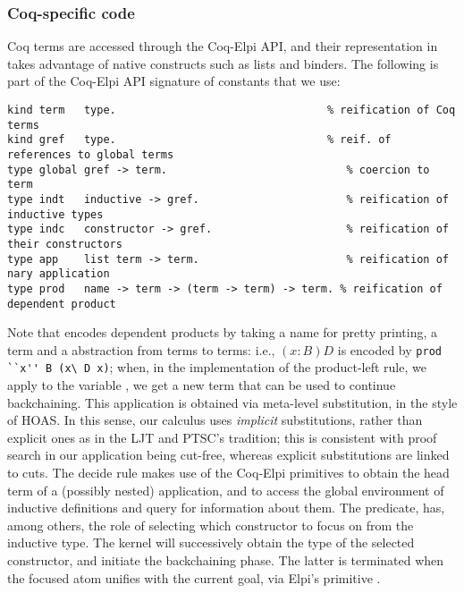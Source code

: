 \subsubsection{Coq-specific code}
Coq terms are accessed through the Coq-Elpi API, and their representation
in \lP takes advantage of native \lP constructs such as lists and binders.
The following is part of the Coq-Elpi API signature of constants that we use:
\begin{lstlisting}[language=lprolog]
kind term   type.                                 % reification of Coq terms
kind gref   type.                                 % reif. of references to global terms
type global gref -> term.                            % coercion to term
type indt   inductive -> gref.                       % reification of inductive types
type indc   constructor -> gref.                     % reification of their constructors 
type app    list term -> term.                       % reification of nary application
type prod   name -> term -> (term -> term) -> term. % reification of dependent product
\end{lstlisting}
%
Note that  encodes dependent products by taking a name for pretty
printing, a term and a \lP abstraction from terms to terms: i.e., $(x :
B) D$ is encoded by \verb|prod ``x'' B (x\ D x)|; when, in the
implementation of the product-left rule, we apply  to the variable
, we get a new term that can be used to continue backchaining. This
application is obtained via meta-level substitution, in the style of HOAS. In
this sense, our calculus uses \emph{implicit} substitutions, rather than
explicit ones as in the  LJT and PTSC's tradition; this is consistent with proof search in
our application being cut-free, whereas explicit substitutions are linked to cuts.
The decide rule makes use of the Coq-Elpi primitives
 to obtain the head term of a (possibly
nested) application, and  to access the global
environment of inductive definitions and query for information about them.
The  predicate,  has, among others, the role of selecting which
constructor to focus on from the inductive type. The kernel will successively
obtain the type of the selected constructor, and initiate the backchaining
phase. The latter is terminated when the focused atom unifies with the current goal, via
Elpi's primitive .

